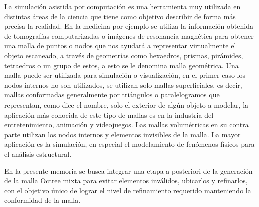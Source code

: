 


La simulación asistida por computación es una herramienta muy utilizada en distintas áreas de la ciencia que tiene como objetivo describir de forma más precisa la realidad. En la medicina por ejemplo se utiliza la información obtenida de tomografías computarizadas o imágenes de resonancia magnética para obtener una malla de puntos o nodos que nos ayudará a representar virtualmente el objeto escaneado, a través de geometrías como hexaedros, prismas, pirámides, tetraedros o un grupo de estos, a esto se le denomina malla geométrica.
Una malla puede ser utilizada para simulación o visualización, en el primer caso los nodos internos no son utilizados, se utilizan solo mallas superficiales, es decir, mallas conformadas generalmente por triángulos o paralelogramos que representan, como dice el nombre, solo el exterior de algún objeto a modelar, la aplicación más conocida de este tipo de mallas es en la industria del entretenimiento, animación y videojuegos.
Las mallas volumétricas en su contra parte utilizan los nodos internos y elementos invisibles de la malla. La mayor aplicación es la simulación, en especial el modelamiento de fenómenos físicos para el análisis estructural.

En la presente memoria se busca integrar una etapa a posteriori de la generación de la malla Octree mixta para evitar elementos inválidos, ubicarlos y refinarlos, con el objetivo único de lograr el nivel de refinamiento requerido manteniendo la conformidad de la malla. 
 
